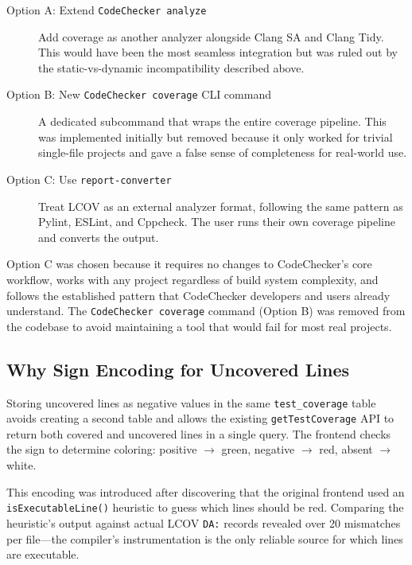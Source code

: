 \begin{description}
    \item[Option A: Extend \texttt{CodeChecker analyze}] Add coverage as another analyzer alongside Clang SA and Clang Tidy. This would have been the most seamless integration but was ruled out by the static-vs-dynamic incompatibility described above.

    \item[Option B: New \texttt{CodeChecker coverage} CLI command] A dedicated subcommand that wraps the entire coverage pipeline. This was implemented initially but removed because it only worked for trivial single-file projects and gave a false sense of completeness for real-world use.

    \item[Option C: Use \texttt{report-converter}] Treat LCOV as an external analyzer format, following the same pattern as Pylint, ESLint, and Cppcheck. The user runs their own coverage pipeline and converts the output.
\end{description}

Option C was chosen because it requires no changes to CodeChecker's core workflow, works with any project regardless of build system complexity, and follows the established pattern that CodeChecker developers and users already understand. The \texttt{CodeChecker coverage} command (Option B) was removed from the codebase to avoid maintaining a tool that would fail for most real projects.

\subsection{Why Sign Encoding for Uncovered Lines}

Storing uncovered lines as negative values in the same \texttt{test\_coverage} table avoids creating a second table and allows the existing \texttt{getTestCoverage} API to return both covered and uncovered lines in a single query. The frontend checks the sign to determine coloring: positive $\rightarrow$ green, negative $\rightarrow$ red, absent $\rightarrow$ white.

This encoding was introduced after discovering that the original frontend used an \texttt{isExecutableLine()} heuristic to guess which lines should be red. Comparing the heuristic's output against actual LCOV \texttt{DA:} records revealed over 20 mismatches per file---the compiler's instrumentation is the only reliable source for which lines are executable.

